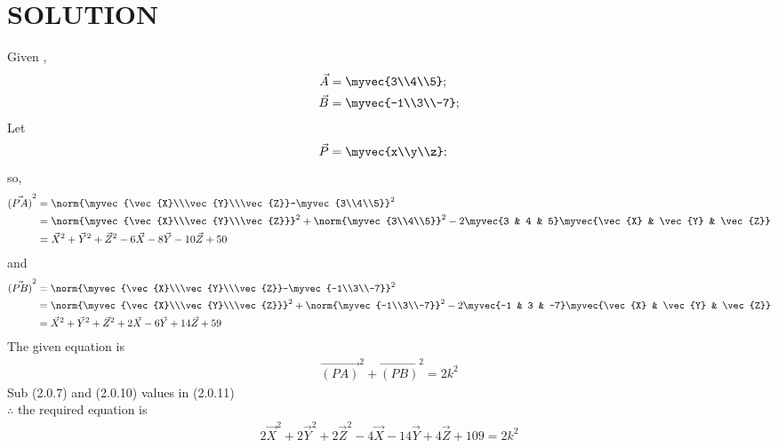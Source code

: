 \documentclass[journal,12pt,twocolumn]{IEEEtran}
\begin{document}
\section{SOLUTION} 
Given ,
\begin{align}
\vec A &=\myvec{3\\4\\5};
  \\
  \vec B &=\myvec{-1\\3\\-7};
\end{align}
Let
\begin{align}
 \vec P &=\myvec{x\\y\\z};
\end{align}
 so,
 \begin{align}
 \vec{(PA)}^2&=\norm{\myvec{\vec{X}\\\vec{Y}\\\vec{Z}}-\myvec{3\\4\\5}}^2\\
 &=\norm{\myvec{\vec{X}\\\vec{Y}\\\vec{Z}}}^2+ \norm{\myvec{3\\4\\5}}^2-2\myvec{3 & 4 & 5}\myvec{\vec{X} & \vec{Y} & \vec{Z}}\\
 &=\vec{X}^2+\vec{Y}^2+\vec{Z}^2-6\vec{X}-8\vec{Y}-10\vec{Z}+50
 \end{align}
 and
 \begin{align}
\vec{(PB)}^2&=\norm{\myvec{\vec{X}\\\vec{Y}\\\vec{Z}}-\myvec{-1\\3\\-7}}^2\\
 &=\norm{\myvec{\vec{X}\\\vec{Y}\\\vec{Z}}}^2+ \norm{\myvec{-1\\3\\-7}}^2-2\myvec{-1 & 3 & -7}\myvec{\vec{X} & \vec{Y} & \vec{Z}}\\
 &=\vec{X}^2+\vec{Y}^2+\vec{Z}^2+2\vec{X}-6\vec{Y}+14\vec{Z}+59
 \end{align}
 The given equation is
\begin{align}
 \vec{(PA)}^2+ \vec{(PB)}^2 =2k^2
 \end{align}
 Sub (2.0.7) and (2.0.10) values in (2.0.11)\\
$\therefore$ the required equation is
\begin{align}
2\vec{X}^2+2\vec{Y}^2+2\vec{Z}^2-4\vec{X}-14\vec{Y}+4\vec{Z}+109=2k^2
\end{align}
\end{document}
